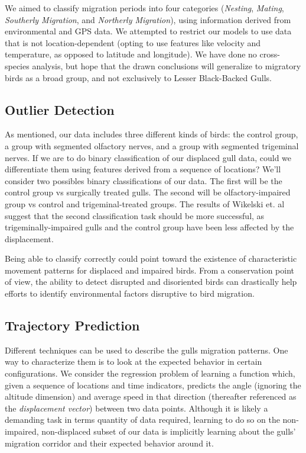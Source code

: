 \documentclass[letterpaper, 10pt, conference]{ieeeconf}  %
\begin{document}
    We aimed to classify migration periods into four categories (\textit{Nesting}, \textit{Mating}, \textit{Southerly Migration}, and \textit{Northerly Migration}), using information derived from environmental and GPS data. We attempted to restrict our models to use data that is not location-dependent (opting to use features like velocity and temperature, as opposed to latitude and longitude). We have done no cross-species analysis, but hope that the drawn conclusions will generalize to migratory birds as a broad group, and not exclusively to Lesser Black-Backed Gulls.
    
\subsection{Outlier Detection}
	As mentioned, our data includes three different kinds of birds: the control group, a group with segmented olfactory nerves, and a group with segmented trigeminal nerves. If we are to do binary classification of our displaced gull data, could we differentiate them using features derived from a sequence of locations? We'll consider two possibles binary classifications of our data. The first will be the control group vs surgically treated gulls. The second will be olfactory-impaired group vs control and trigeminal-treated groups. The results of Wikelski et. al \cite{navigation} suggest that the second classification task should be more successful, as trigeminally-impaired gulls and the control group have been less affected by the displacement.

	Being able to classify correctly could point toward the existence of characteristic movement patterns for displaced and impaired birds. From a conservation point of view, the ability to detect disrupted and disoriented birds can drastically help efforts to identify environmental factors disruptive to bird migration.

\subsection{Trajectory Prediction}
	Different techniques can be used to describe the gulls migration patterns. One way to characterize them is to look at the expected behavior in certain configurations. We consider the regression problem of learning a function which, given a sequence of locations and time indicators, predicts the angle (ignoring the altitude dimension) and average speed in that direction (thereafter referenced as the \textit{displacement vector}) between two data points. Although it is likely a demanding task in terms quantity of data required, learning to do so on the non-impaired, non-displaced subset of our data is implicitly learning about the gulls' migration corridor and their expected behavior around it. 
\end{document}
